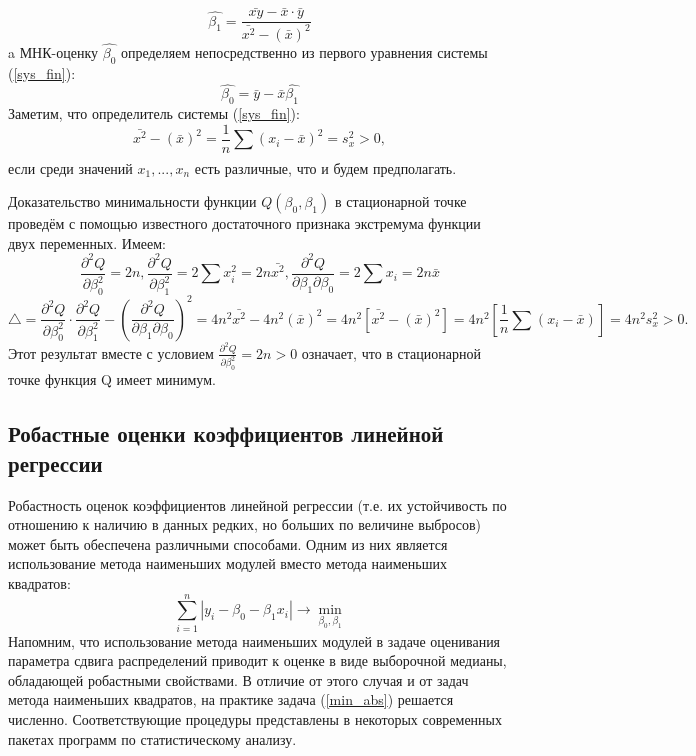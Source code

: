 \documentclass[12pt]{article}
\begin{document}
	\begin{equation}
		\hat{\beta_{1}} = \frac{\bar{xy} - \bar{x} \cdot \bar{y}}{\bar{x^{2}} - (\bar{x})^{2}}
		\label{beta_1_new}
	\end{equation}
	a МНК-оценку $\hat{\beta_0}$  определяем непосредственно из первого уравнения системы (\ref{sys_fin}):
	\begin{equation}
		\hat{\beta_{0}} = \bar{y} - \bar{x}\hat{\beta_{1}}
		\label{beta_0_new}
	\end{equation}
	Заметим, что определитель системы (\ref{sys_fin}):
	\begin{equation}
		\bar{x^{2}} - (\bar{x})^{2} = \frac{1}{n}\sum_{}{}{(x_{i} - \bar{x})^{2}} = s_{x}^{2} > 0, 
	\end{equation}
	если среди значений $x_{1},...,x_{n}$ есть различные, что и будем предполагать.
	
	Доказательство минимальности функции $Q(\beta_{0}, \beta_{1})$ в стационарной точке проведём с помощью известного достаточного признака экстремума функции двух переменных. Имеем:
	\begin{equation}
		\frac{\partial ^{2} Q}{\partial \beta_{0}^{2}} = 2n, 
		\frac{\partial ^{2} Q}{\partial \beta_{1}^{2}} = 2\sum_{}{}{x_{i}^{2}} = 2n\bar{x^{2}}, 
		\frac{\partial ^{2} Q}{\partial \beta_{1} \partial \beta_{0}} = 2\sum_{}{}{x_{i}} = 2n\bar{x}
		\label{frac_eq}
	\end{equation}
	\begin{equation}
		\bigtriangleup = \frac{\partial^{2}Q}{\partial \beta_{0}^{2}} \cdot \frac{\partial^{2}Q}{\partial \beta_{1}^{2}} - (\frac{\partial^{2}Q}{\partial \beta_{1} \partial \beta_{0}})^{2} = 
		4n^{2}\bar{x^{2}} - 4n^2(\bar{x})^{2} = 
		4n^{2}\left[\bar{x^{2}} - (\bar{x})^{2}\right] = 4n^{2}\left[ \frac{1}{n}\sum{}_{}{(x_{i} - \bar{x})}\right] = 4n^{2}s_{x}^{2} > 0.
		\label{det_sys}
	\end{equation}
	Этот результат вместе с условием $\frac{\partial^{2}Q}{\partial \beta_{0}^{2}} = 2n > 0$ означает, что в стационарной точке функция Q имеет минимум.
	
	\subsection{Робастные оценки коэффициентов линейной регрессии}
	Робастность оценок коэффициентов линейной регрессии (т.е. их устойчивость по отношению к наличию в данных редких, но больших по величине выбросов) может быть обеспечена различными способами. Одним из них является использование метода наименьших модулей вместо метода наименьших квадратов:
	\begin{equation}
		\sum_{i=1}^{n}{|y_{i} - \beta_{0} - \beta_{1}x_{i}|}\rightarrow \min_{\beta_{0}, \beta_{1}}
		\label{min_abs}
	\end{equation}
	Напомним, что использование метода наименьших модулей в задаче оценивания параметра сдвига распределений приводит к оценке в виде выборочной медианы, обладающей робастными свойствами. В отличие от этого случая и от задач метода наименьших квадратов, на практике задача (\ref{min_abs}) решается численно. Соответствующие процедуры представлены в некоторых современных пакетах программ по статистическому анализу.
	
\end{document}
